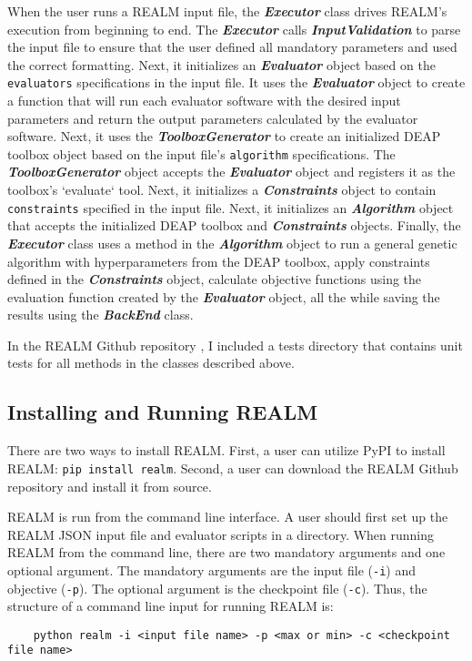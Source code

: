 When the user runs a REALM input file, the \textbf{\textit{Executor}} class 
drives REALM's execution from beginning to end.
The \textbf{\textit{Executor}} calls \textbf{\textit{InputValidation}} to 
parse the input file to ensure that the user defined all mandatory parameters
and used the correct formatting.
Next, it initializes an \textbf{\textit{Evaluator}} object based on the 
\texttt{evaluators} specifications in the input file. 
It uses the \textbf{\textit{Evaluator}} object to create a function that will 
run each evaluator software with the desired input parameters and return the 
output parameters calculated by the evaluator software. 
Next, it uses the \textbf{\textit{ToolboxGenerator}} to create an initialized 
DEAP toolbox object based on the input file's \texttt{algorithm} specifications. 
The \textbf{\textit{ToolboxGenerator}} object accepts the 
\textbf{\textit{Evaluator}} object and registers it as the toolbox's `evaluate` 
tool.  
Next, it initializes a \textbf{\textit{Constraints}} object to contain 
\texttt{constraints} specified in the input file. 
Next, it initializes an \textbf{\textit{Algorithm}} object that accepts the 
initialized DEAP toolbox and \textbf{\textit{Constraints}} objects. 
Finally, the \textbf{\textit{Executor}} class uses a method in the 
\textbf{\textit{Algorithm}} object to run a general genetic algorithm with 
hyperparameters from the DEAP toolbox, apply constraints defined in the 
\textbf{\textit{Constraints}} object, calculate objective functions using the evaluation 
function created by the \textbf{\textit{Evaluator}} object, all the while 
saving the results using the \textbf{\textit{BackEnd}} class. 

In the REALM Github repository \cite{chee_arfcrealm_2021}, I included a tests 
directory that contains unit tests for all methods in the classes described 
above. 

\subsection{Installing and Running REALM}
There are two ways to install REALM.
First, a user can utilize \gls{PyPI} to install REALM: \texttt{pip install realm}.
Second, a user can download the REALM Github repository \cite{chee_arfcrealm_2021}
and install it from source. 

REALM is run from the command line interface. 
A user should first set up the REALM JSON input file and evaluator 
scripts in a directory. 
When running REALM from the command line, there are two mandatory arguments and 
one optional argument. 
The mandatory arguments are the input file (\texttt{-i}) and objective (\texttt{-p}). 
The optional argument is the checkpoint file (\texttt{-c}).  
Thus, the structure of a command line input for running REALM is: 
\begin{verbatim}
    python realm -i <input file name> -p <max or min> -c <checkpoint file name>
\end{verbatim} 

